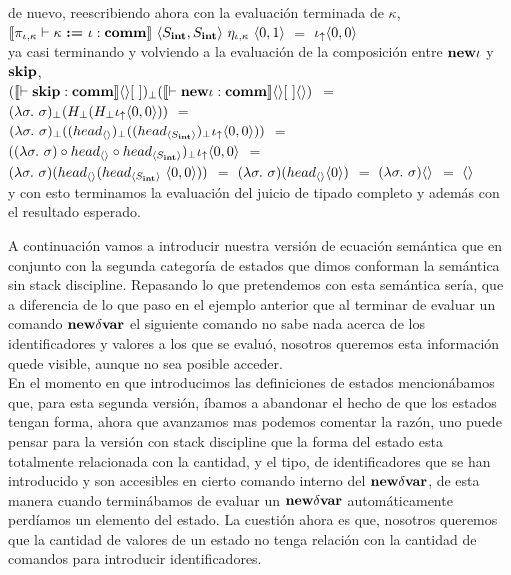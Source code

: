 de nuevo, reescribiendo ahora con la evaluaci\'on terminada de $\kappa$,\\

$\llbracket \pi_{\iota,\kappa} \vdash \kappa \ \textbf{:=} \ \iota: \textbf{comm} \rrbracket
		\ \langle S_{\textbf{int}},S_{\textbf{int}} \rangle \ \eta_{\iota,\kappa}
		\ \langle 0,1 \rangle$ $=$ $\iota_{\uparrow} \langle 0,0 \rangle$\\
		
ya casi terminando y volviendo a la evaluaci\'on de la composici\'on entre
$\textbf{new} \iota$ y $\textbf{skip}$, \\

$(\llbracket \vdash \textbf{skip} : \textbf{comm} \rrbracket\langle  \rangle[ \ ])_{\bot}
(\llbracket \vdash \textbf{new} \iota : \textbf{comm} \rrbracket\langle  \rangle[ \ ]\langle  \rangle)$
$=$\\
\indent 
$(\lambda \sigma . \ \sigma)_\bot (H_{\bot} (H_{\bot} \iota_{\uparrow} \langle 0,0 \rangle))$ $=$\\
\indent
$(\lambda \sigma . \ \sigma)_\bot 
	((head_{\langle  \rangle})_{\bot} ((head_{\langle S_{\textbf{int}} \rangle})_{\bot} \iota_{\uparrow} \langle 0,0 \rangle))$ $=$\\
\indent
$((\lambda \sigma . \ \sigma) \circ 
	head_{\langle  \rangle} \circ head_{\langle S_{\textbf{int}} \rangle})_{\bot} \iota_{\uparrow} \langle 0,0 \rangle$ $=$\\
\indent
$(\lambda \sigma . \ \sigma) (head_{\lrangles{}} (head_{\lrangles{S_\intt}} \ \lrangles{0,0}))$ $=$
$(\lambda \sigma . \ \sigma) (head_{\langle  \rangle} \langle 0 \rangle)$ $=$ 
$(\lambda \sigma . \ \sigma)\lrangles{}$ $=$ $\langle  \rangle$\\

y con esto terminamos la evaluaci\'on del juicio de tipado completo y adem\'as con 
el resultado esperado.

A continuaci\'on vamos a introducir nuestra versi\'on de ecuaci\'on sem\'antica
que en conjunto con la segunda categor\'ia de estados que dimos conforman la sem\'antica
sin stack discipline. Repasando lo que pretendemos con esta sem\'antica ser\'ia, 
que a diferencia de lo que paso en el ejemplo anterior que al terminar de evaluar
un comando $\textbf{new} \delta \textbf{var}$ el siguiente comando no sabe nada acerca de los
identificadores y valores a los que se evalu\'o, nosotros queremos esta informaci\'on
quede visible, aunque no sea posible acceder.\\

En el momento en que introducimos las definiciones de estados mencion\'abamos 
que, para esta segunda versi\'on, \'ibamos a abandonar el hecho de que los estados tengan
forma, ahora que avanzamos mas podemos comentar la raz\'on, uno puede pensar para la
versi\'on con stack discipline que la forma del estado esta totalmente relacionada
con la cantidad, y el tipo, de identificadores que se han introducido y son accesibles
en cierto comando interno del $\textbf{new} \delta \textbf{var}$, de esta manera cuando termin\'abamos 
de evaluar un $\textbf{new} \delta \textbf{var}$ autom\'aticamente perd\'iamos un elemento del estado.
La cuesti\'on ahora es que, nosotros queremos que la cantidad de valores de un
estado no tenga relaci\'on con la cantidad de comandos para introducir identificadores.\\

